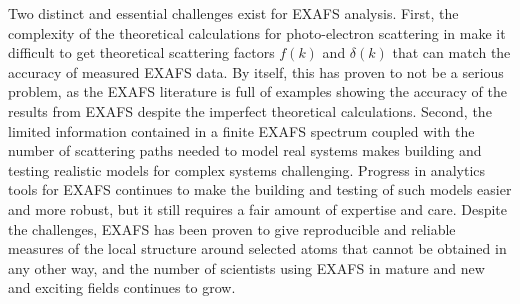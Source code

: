 Two distinct and essential challenges exist for EXAFS analysis.  First, the
complexity of the theoretical calculations for photo-electron scattering in
make it difficult to get theoretical scattering factors $f(k)$ and
$\delta(k)$ that can match the accuracy of measured EXAFS data.  By itself,
this has proven to not be a serious problem, as the EXAFS literature is
full of examples showing the accuracy of the results from EXAFS despite the
imperfect theoretical calculations.  Second, the limited information
contained in a finite EXAFS spectrum coupled with the number of scattering
paths needed to model real systems makes building and testing realistic
models for complex systems challenging.  Progress in analytics tools for
EXAFS continues to make the building and testing of such models easier and
more robust, but it still requires a fair amount of expertise and care.
Despite the challenges, EXAFS has been proven to give reproducible and
reliable measures of the local structure around selected atoms that cannot
be obtained in any other way, and the number of scientists using EXAFS in
mature and new and exciting fields continues to grow.


